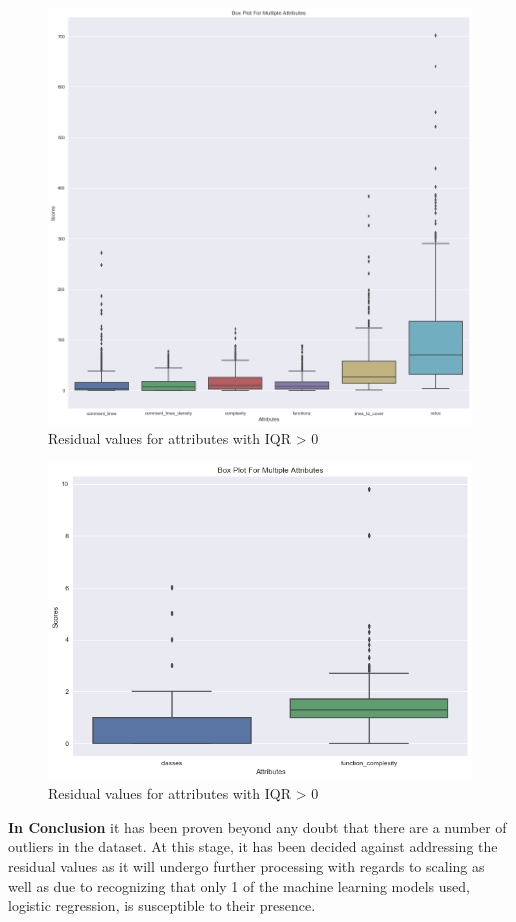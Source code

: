 \begin{figure}[!h]
    \centering
    \includegraphics[scale=0.45]{Figures/boxplot_iqr_above_0_part1.png}
    \caption{Residual values for attributes with IQR > 0}
    \label{fig:outliers:boxplot-iqr-above-0-part1}
\end{figure}

\begin{figure}[!h]
    \centering
    \includegraphics[scale=0.65]{Figures/boxplot_iqr_above_0_part2.png}
    \caption{Residual values for attributes with IQR > 0}
    \label{fig:outliers:boxplot-iqr-above-0-part2}
\end{figure}

\textbf{In Conclusion} it has been proven beyond any doubt that there are a number of outliers in the dataset. At this stage, it has been decided against addressing the residual values as it will undergo further processing with regards to scaling as well as due to recognizing that only 1 of the machine learning models used, logistic regression, is susceptible to their presence. 
\FloatBarrier